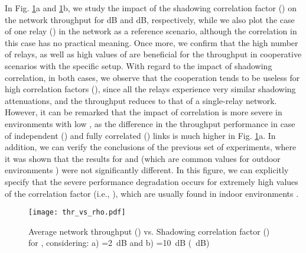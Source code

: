 \documentclass[12pt,draftcls, onecolumn]{IEEEtran}
\begin{document}
In Fig. \ref{th2}a and \ref{th2}b, we study the impact of the shadowing correlation factor () on the network throughput for  dB and  dB, respectively, while we also plot the case of one relay () in the network as a reference scenario, although the correlation in this case has no practical meaning. Once more, we confirm that the high number of relays, as well as high values of  are beneficial for the throughput in cooperative scenarios with the specific setup. With regard to the impact of shadowing correlation, in both cases, we observe that the cooperation tends to be useless for high correlation factors (), since all the relays experience very similar shadowing attenuations, and the throughput reduces to that of a single-relay network. However, it can be remarked that the impact of correlation is more severe in environments with low , as the difference in the throughput performance in case of independent () and fully correlated () links is much higher in Fig. \ref{th2}a. In addition, we can verify the conclusions of the previous set of experiments, where it was shown that the results for  and  (which are common values for outdoor environments \cite{out_cor}) were not significantly different. In this figure, we can explicitly specify that the severe performance degradation occurs for extremely high values of the correlation factor (i.e., ), which are usually found in indoor environments \cite{in_cor1,in_cor2}.

\begin{figure}[htb]
\centering
\texttt{[image: thr\_vs\_rho.pdf]}
\caption{Average network throughput () vs. Shadowing correlation factor () for , considering: a) =2~dB and b) =10~dB (~dB)}\label{th2}
\end{figure}
\end{document}
